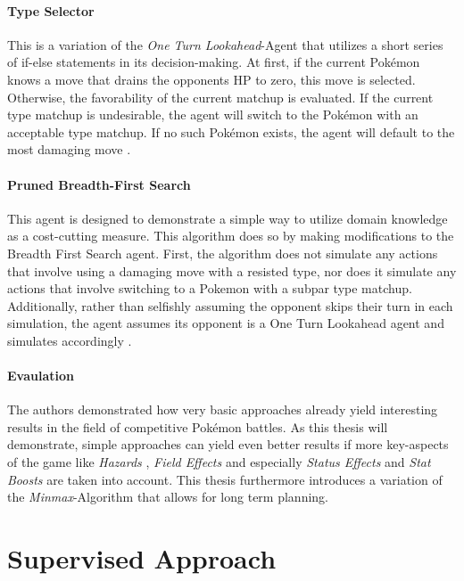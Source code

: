 \paragraph{Type Selector}
This is a variation of the \textit{One Turn Lookahead}-Agent that utilizes a short series of
if-else statements in its decision-making. At first, if the current Pokémon knows a move 
that drains the opponents \ac{HP} to zero, this move is selected. Otherwise, the 
favorability of the current matchup is evaluated. If the current type matchup is 
undesirable, the agent will switch to the Pokémon with an acceptable type matchup. If no
such Pokémon exists, the agent will default to the most damaging move 
\cite{Lee_Togelius_2017}.

\paragraph{Pruned Breadth-First Search}
This agent is designed to demonstrate a simple way to utilize domain knowledge as a cost-cutting 
measure. This algorithm does so by making modifications to the Breadth First Search agent. First, 
the algorithm does not simulate any actions that involve using a damaging move with a resisted type, 
nor does it simulate any actions that involve switching to a Pokemon with a subpar type matchup. 
Additionally, rather than selfishly assuming the opponent skips their turn in each simulation, the 
agent assumes its opponent is a One Turn Lookahead agent and simulates accordingly
\cite{Lee_Togelius_2017}.

\paragraph{Evaulation}
The authors demonstrated how very basic approaches already yield interesting results in the 
field of competitive Pokémon battles. As this thesis will demonstrate, simple approaches can 
yield even better results if more key-aspects of the game like \textit{Hazards} ,
\textit{Field Effects}  and especially \textit{Status Effects}
 and \textit{Stat Boosts} are taken into account. This thesis furthermore
introduces a variation of the \textit{Minmax}-Algorithm that allows for long term planning.

\section{Supervised Approach}

